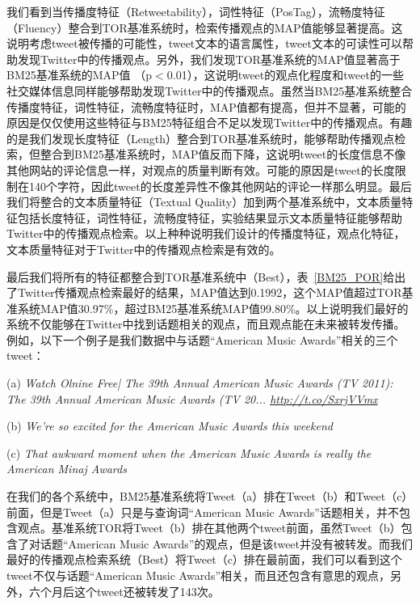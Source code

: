 我们看到当传播度特征（Retweetability），词性特征（PosTag），流畅度特征（Fluency）整合到TOR基准系统时，检索传播观点的MAP值能够显著提高。这说明考虑tweet被传播的可能性，tweet文本的语言属性，tweet文本的可读性可以帮助发现Twitter中的传播观点。另外，我们发现TOR基准系统的MAP值显著高于BM25基准系统的MAP值 （p$<$0.01），这说明tweet的观点化程度和tweet的一些社交媒体信息同样能够帮助发现Twitter中的传播观点。虽然当BM25基准系统整合传播度特征，词性特征，流畅度特征时，MAP值都有提高，但并不显著，可能的原因是仅仅使用这些特征与BM25特征组合不足以发现Twitter中的传播观点。有趣的是我们发现长度特征（Length）整合到TOR基准系统时，能够帮助传播观点检索，但整合到BM25基准系统时，MAP值反而下降，这说明tweet的长度信息不像其他网站的评论信息一样，对观点的质量判断有效。可能的原因是tweet的长度限制在140个字符，因此tweet的长度差异性不像其他网站的评论一样那么明显。最后我们将整合的文本质量特征（Textual Quality）加到两个基准系统中，文本质量特征包括长度特征，词性特征，流畅度特征，实验结果显示文本质量特征能够帮助Twitter中的传播观点检索。以上种种说明我们设计的传播度特征，观点化特征，文本质量特征对于Twitter中的传播观点检索是有效的。

最后我们将所有的特征都整合到TOR基准系统中（Best），表~\ref{BM25_POR}给出了Twitter传播观点检索最好的结果，MAP值达到0.1992，这个MAP值超过TOR基准系统MAP值30.97\%，超过BM25基准系统MAP值99.80\%。以上说明我们最好的系统不仅能够在Twitter中找到话题相关的观点，而且观点能在未来被转发传播。例如，以下一个例子是我们数据中与话题“American Music Awards”相关的三个tweet：

\begin{description}
\item{(a)} \emph{Watch Olnine Free| The 39th Annual American Music Awards (TV 2011): The 39th Annual American Music Awards (TV 20... \url{http://t.co/SxrjVVmx}}
\item{(b)} \emph{We're so excited for the American Music Awards this weekend}
\item{(c)} \emph{That awkward moment when the American Music Awards is really the American Minaj Awards}
\end{description}

在我们的各个系统中，BM25基准系统将Tweet（a）排在Tweet（b）和Tweet（c）前面，但是Tweet（a）只是与查询词“American Music Awards”话题相关，并不包含观点。基准系统TOR将Tweet（b）排在其他两个tweet前面，虽然Tweet（b）包含了对话题“American Music Awards”的观点，但是该tweet并没有被转发。而我们最好的传播观点检索系统（Best）将Tweet（c）排在最前面，我们可以看到这个tweet不仅与话题“American Music Awards”相关，而且还包含有意思的观点，另外，六个月后这个tweet还被转发了143次。

